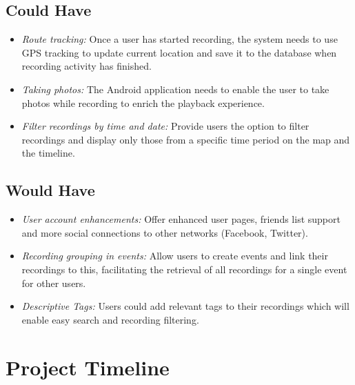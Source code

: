 \documentclass{l3proj}
\begin{document}
\subsection{Could Have}
	\begin{itemize}
	\item{ \textit{Route tracking:} Once a user has started recording, the system needs to use GPS tracking to update current location and save it to the database when recording activity has finished.}
	\item{ \textit{Taking photos:} The Android application needs to enable the user to take photos while recording to enrich the playback experience.}
	\item{ \textit{Filter recordings by time and date:} Provide users the option to filter recordings and display only those from a specific time period on the map and the timeline.}
	\end{itemize}

\subsection{Would Have}
	\begin{itemize}
	\item{ \textit{User account enhancements:} Offer enhanced user pages, friends list support and more social connections to other networks (Facebook, Twitter).}
	\item{ \textit{Recording grouping in events:} Allow users to create events and link their recordings to this, facilitating the retrieval of all recordings for a single event for other users.}
	\item{ \textit{Descriptive Tags:} Users could add relevant tags to their recordings which will enable easy search and recording filtering.}
	\end{itemize}

\section{Project Timeline}



\end{document}
